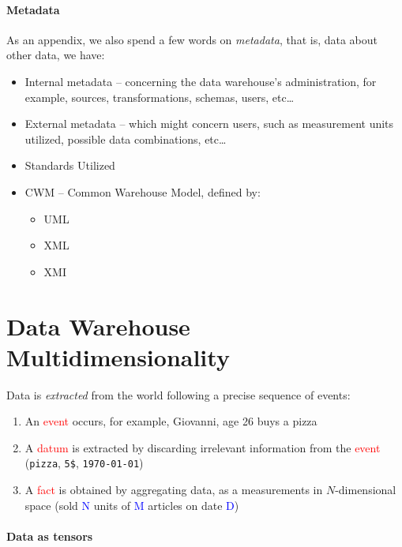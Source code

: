 \documentclass[openright, twoside, twocolumn]{report}
\begin{document}
\paragraph{Metadata}

As an appendix, we also spend a few words on \emph{metadata}, that is, data
about other data, we have:

\begin{itemize}
  \item Internal metadata -- concerning the data warehouse's administration, for example,
  sources, transformations, schemas, users, etc\dots
  \item External metadata -- which might concern users, such as measurement units utilized, possible
  data combinations, etc\dots
  \item Standards Utilized
  \item CWM -- Common Warehouse Model, defined by:
  \begin{itemize}
    \item UML
    \item XML
    \item XMI
  \end{itemize}
\end{itemize}

\section{Data Warehouse Multidimensionality}

Data is \emph{extracted} from the world following a precise sequence of
events:

\begin{enumerate}
  \item An \textcolor{red}{event} occurs, for example, Giovanni, age 26 buys a pizza
  \item A \textcolor{red}{datum} is extracted by discarding irrelevant
  information from the \textcolor{red}{event} (\texttt{pizza}, \texttt{5\$}, \texttt{\today})
  \item A \textcolor{red}{fact} is obtained by aggregating data, as a measurements
  in $N$-dimensional space (sold \textcolor{blue}{N} units of \textcolor{blue}{M} articles
  on date \textcolor{blue}{D})
\end{enumerate}

\paragraph{Data as tensors}
\end{document}
